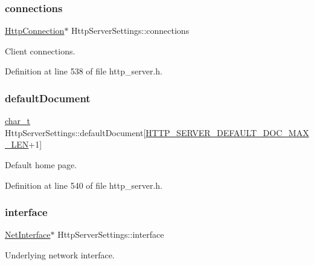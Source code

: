 \subsubsection{\texorpdfstring{connections}{connections}}
{\footnotesize\ttfamily \hyperlink{http__server_8h_a3506ecffde998ab02629dca83587d2f9}{Http\+Connection}$\ast$ Http\+Server\+Settings\+::connections}



Client connections. 



Definition at line 538 of file http\+\_\+server.\+h.

\mbox{\label{structHttpServerSettings_a9bdbfb6cff737fd113955ed3ac74045b}} 
\subsubsection{\texorpdfstring{default\+Document}{defaultDocument}}
{\footnotesize\ttfamily \hyperlink{compiler__port_8h_a40bb5262bf908c328fbcfbe5d29d0201}{char\+\_\+t} Http\+Server\+Settings\+::default\+Document\mbox{[}\hyperlink{http__server_8h_a42e58ec2d2872d2ca3ca85a1ec383745}{H\+T\+T\+P\+\_\+\+S\+E\+R\+V\+E\+R\+\_\+\+D\+E\+F\+A\+U\+L\+T\+\_\+\+D\+O\+C\+\_\+\+M\+A\+X\+\_\+\+L\+EN}+1\mbox{]}}



Default home page. 



Definition at line 540 of file http\+\_\+server.\+h.

\mbox{\label{structHttpServerSettings_a6bbe22548511f1840919ccb1a2de54dc}} 
\subsubsection{\texorpdfstring{interface}{interface}}
{\footnotesize\ttfamily \hyperlink{net_8h_a2234db8911a1148c9159979d8f5e0d6b}{Net\+Interface}$\ast$ Http\+Server\+Settings\+::interface}



Underlying network interface. 




